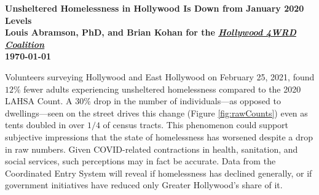 \documentclass[11pt]{article}
\def\bfr{\bf\color{red}}
\begin{document}

\begin{center}
	\Large\bf Unsheltered Homelessness in Hollywood Is Down from January 2020 Levels\\
	\vspace{1ex}
	{\normalsize\rm Louis Abramson, PhD, and Brian Kohan 
	for the \href{http://www.hollywood4wrd.live}{\it Hollywood 4WRD Coalition} \\ \today 
	}%
\end{center}

 Volunteers surveying Hollywood and East Hollywood on February 25, 
2021, found $12\%$ fewer adults experiencing unsheltered homelessness compared to the 2020 
LAHSA Count. A 30\% drop in the number of individuals---as opposed to dwellings---seen on the street
drives this change (Figure \ref{fig:rawCounts}) even as tents doubled in over $1/4$ of 
census tracts. This phenomenon could support subjective impressions that the state of homelessness 
has worsened despite a drop in raw numbers. Given COVID-related contractions in
health, sanitation, and social services, such perceptions may in fact be accurate. Data from the 
Coordinated Entry System will reveal if homelessness has declined generally, or if government 
initiatives have reduced only Greater Hollywood's share of it.


\end{document}
